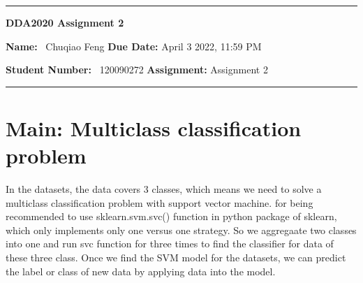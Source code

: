 \documentclass{article}
\begin{document}
\rmfamily 
\hrule
\begin{center}
	\vspace{.4cm}
	{\textbf { \huge DDA2020 Assignment 2}}
\end{center}
\setlength{\baselineskip}{20pt}
\noindent
{\textbf{Name:} \ Chuqiao Feng \hspace{\fill} \textbf{Due Date:} April 3 2022, 11:59 PM \\ 
{\textbf{Student Number:} \ 120090272 \hspace{\fill} \textbf{Assignment:} Assignment 2 \\
\hrule

\section*{Main: Multiclass classification problem}
\large
\hspace{12pt} In the datasets, the data covers 3 classes, which means we need to solve a multiclass classification problem with support vector machine.
for being recommended to use sklearn.svm.svc() function in python package of sklearn, which only implements only one versus one strategy. So we aggregaate two classes into one and run svc function for three times to find the classifier for data of these three class.
Once we find the SVM model for the datasets, we can predict the label or class of new data by applying data into the model.

}}
\end{document}
